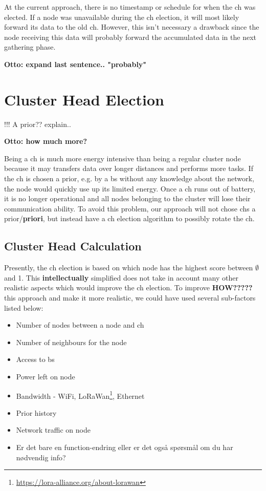 \documentclass[USenglish]{uit-thesis}
\begin{document}
At the current approach, there is no timestamp or schedule for when the \gls{ch} was elected. If a node was unavailable during the \gls{ch} election, it will most likely forward its data to the old \gls{ch}. However, this isn't necessary a drawback since the node receiving this data will probably forward the accumulated data in the next gathering phase.

\textbf{Otto: expand last sentence.. "probably"}


\section{Cluster Head Election}
!!! A prior?? explain..

\textbf{Otto: how much more?}

Being a \gls{ch} is much more energy intensive than being a regular cluster node because it may transfers data over longer distances and performs more tasks. If the \gls{ch} is chosen a prior, e.g. by a \gls{bs} without any knowledge about the network, the node would quickly use up its limited energy. Once a \gls{ch} runs out of battery, it is no longer operational and all nodes belonging to the cluster will lose their communication ability. To avoid this problem, our approach will not chose \gls{ch}s a prior/\textbf{priori}, but instead have a \gls{ch} election algorithm to possibly rotate the \gls{ch}.


\subsection{Cluster Head Calculation} \label{ssec:ch_election}
Presently, the \gls{ch} election is based on which node has the highest score between $\emptyset$ and 1. This \textbf{intellectually} simplified does not take in account many other realistic aspects which would improve the \gls{ch} election. To improve \textbf{HOW?????} this approach and make it more realistic, we could have used several sub-factors listed below:


\begin{itemize}
\item Number of nodes between a node and \gls{ch}
\item Number of neighbours for the node
\item Access to \gls{bs}
\item Power left on node
\item Bandwidth - WiFi, LoRaWan\footnote{\url{https://lora-alliance.org/about-lorawan}}, Ethernet
\item Prior history
\item Network traffic on node
\item Er det bare en function-endring eller er det også spørsmål om du har nødvendig info?
\end{itemize}
\end{document}
